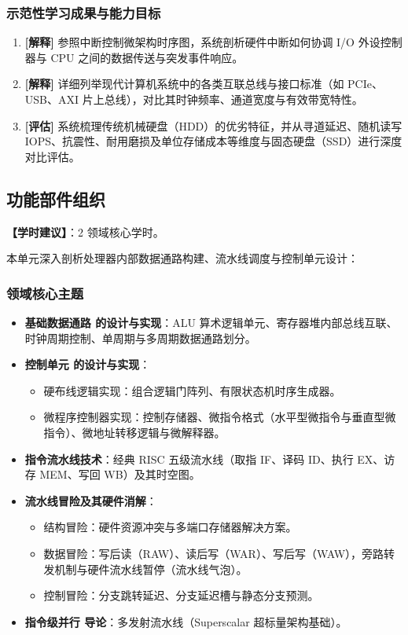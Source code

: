 \subsubsection{示范性学习成果与能力目标}
\begin{enumerate}
    \item \textbf{[解释]} 参照中断控制微架构时序图，系统剖析硬件中断如何协调 I/O 外设控制器与 CPU 之间的数据传送与突发事件响应。
    \item \textbf{[解释]} 详细列举现代计算机系统中的各类互联总线与接口标准（如 PCIe、USB、AXI 片上总线），对比其时钟频率、通道宽度与有效带宽特性。
    \item \textbf{[评估]} 系统梳理传统机械硬盘（HDD）的优劣特征，并从寻道延迟、随机读写 IOPS、抗震性、耐用磨损及单位存储成本等维度与固态硬盘（SSD）进行深度对比评估。
\end{enumerate}

\subsection{功能部件组织}
\textbf{【学时建议】}：2 领域核心学时。

本单元深入剖析处理器内部数据通路构建、流水线调度与控制单元设计：

\subsubsection{领域核心主题}
\begin{itemize}
    \item \textbf{基础数据通路 的设计与实现}：ALU 算术逻辑单元、寄存器堆内部总线互联、时钟周期控制、单周期与多周期数据通路划分。
    \item \textbf{控制单元 的设计与实现}：
    \begin{itemize}
        \item 硬布线逻辑实现：组合逻辑门阵列、有限状态机时序生成器。
        \item 微程序控制器实现：控制存储器、微指令格式（水平型微指令与垂直型微指令）、微地址转移逻辑与微解释器。
    \end{itemize}
    \item \textbf{指令流水线技术}：经典 RISC 五级流水线（取指 IF、译码 ID、执行 EX、访存 MEM、写回 WB）及其时空图。
    \item \textbf{流水线冒险及其硬件消解}：
    \begin{itemize}
        \item 结构冒险：硬件资源冲突与多端口存储器解决方案。
        \item 数据冒险：写后读（RAW）、读后写（WAR）、写后写（WAW），旁路转发机制与硬件流水线暂停（流水线气泡）。
        \item 控制冒险：分支跳转延迟、分支延迟槽与静态分支预测。
    \end{itemize}
    \item \textbf{指令级并行 导论}：多发射流水线（Superscalar 超标量架构基础）。
\end{itemize}

